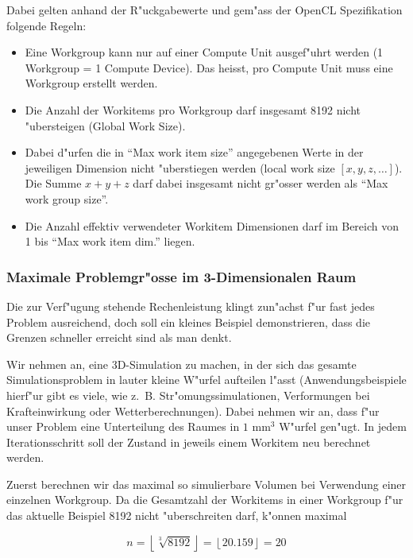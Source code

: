 \begin{refsection}
\begin{description}
\end{description}


\noindent Dabei gelten anhand der R"uckgabewerte und gem"ass der OpenCL
Spezifikation\cite{crypto:opencl_ref} folgende Regeln:

\begin{itemize}
 \item Eine Workgroup kann nur auf einer Compute Unit ausgef"uhrt werden (1 Workgroup = 1 
       Compute Device). Das heisst, pro Compute Unit muss eine Workgroup erstellt werden.
 \item Die Anzahl der Workitems pro Workgroup darf insgesamt 8192 nicht
	 "ubersteigen (Global Work Size).
 \item Dabei d"urfen die in ``Max work item size'' angegebenen Werte in der jeweiligen 
       Dimension nicht "uberstiegen werden (local work size $[x,y,z,\ldots]$).
			 Die Summe $x + y + z$ darf dabei insgesamt nicht gr"osser werden als ``Max work group size''.
 \item Die Anzahl effektiv verwendeter Workitem Dimensionen darf im Bereich von 1 bis
       ``Max work item dim.'' liegen.
\end{itemize}


\subsubsection {Maximale Problemgr"osse im 3-Dimensionalen Raum}
\label{crypto:problemgroesse:3d}

Die zur Verf"ugung stehende Rechenleistung klingt zun"achst f"ur fast jedes Problem
ausreichend, doch soll ein kleines Beispiel demonstrieren, dass die Grenzen
schneller erreicht sind als man denkt.

Wir nehmen an, eine 3D-Simulation zu machen, in der sich das gesamte
Simulationsproblem in lauter kleine W"urfel aufteilen l"asst
(Anwendungsbeispiele hierf"ur gibt es viele, wie z.~B. Str"omungssimulationen,
Verformungen bei Krafteinwirkung oder Wetterberechnungen). Dabei nehmen wir an,
dass f"ur unser Problem eine Unterteilung des Raumes in $1\textrm{ mm}^{3}$
W"urfel gen"ugt. In jedem Iterationsschritt soll der Zustand in jeweils
einem Workitem neu berechnet werden.

Zuerst berechnen wir das maximal so simulierbare Volumen bei Verwendung einer einzelnen
Workgroup.  Da die Gesamtzahl der Workitems in einer Workgroup f"ur das aktuelle
Beispiel 8192 nicht "uberschreiten darf, k"onnen maximal

\[
 n = \left\lfloor\sqrt[3]{8192}\right\rfloor = \left\lfloor20.159\right\rfloor = 20
\]


\end{refsection}
